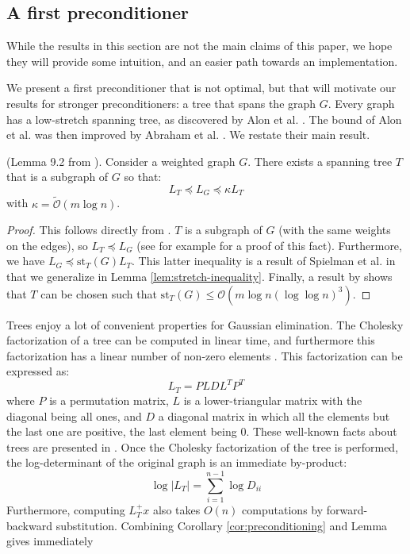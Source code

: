 
\subsection{A first preconditioner\label{sec:A-first-preconditioner}}

While the results in this section are not the main claims of this
paper, we hope they will provide some intuition, and an easier path
towards an implementation.

We present a first preconditioner that is not optimal, but that will
motivate our results for stronger preconditioners: a tree that spans
the graph $G$. Every graph has a low-stretch spanning tree, as discovered
by Alon et al. \cite{Alon1995}. The bound of Alon et al. was then
improved by Abraham et al. \cite{Abraham2008}. We restate their main
result. 
\begin{lemma}(Lemma 9.2 from \cite{Spielman2009a}). Consider a weighted graph $G$. There exists a spanning tree $T$ that is a subgraph of $G$ so that: 
\[
L_{T}\preceq L_{G}\preceq\kappa L_{T}
\]
with $\kappa = \tilde{\mathcal{O}}\left(m\log n\right)$. %
\label{lem:tree-st}
\end{lemma} 

\begin{proof} This follows directly from \cite{Spielman2009a}. $T$
is a subgraph of $G$ (with the same weights on the edges), so
$L_{T}\preceq L_{G}$ (see \cite{Spielman2009a} for example for a
proof of this fact). Furthermore, we have $L_{G}\preceq\text{st}_{T}\left(G\right)L_{T}$.
This latter inequality is a result of Spielman et al. in \cite{Spielman2010} that we generalize
in Lemma \ref{lem:stretch-inequality}. Finally, a result by \cite{Abraham2008} shows that $T$ can be chosen such that $\text{st}_{T}\left(G\right) \leq \mathcal{O}(m\log n (\log\log n)^3)$.\end{proof}

Trees enjoy a lot of convenient properties for Gaussian elimination.
The Cholesky factorization of a tree can be computed in linear time,
and furthermore this factorization has a linear number of non-zero
elements \cite{Spielman2009a}. This factorization can be expressed
as: 
\[
L_{T}=PLDL^{T}P^{T}
\]
where $P$ is a permutation matrix, $L$ is a lower-triangular matrix
with the diagonal being all ones, and $D$ a diagonal matrix in which
all the elements but the last one are positive, the last element being
$0$. These well-known facts about trees are presented in \cite{Spielman2009a}.
Once the Cholesky factorization of the tree is performed, the log-determinant
of the original graph is an immediate by-product: 
\[
\log\left|L_{T}\right|=\sum_{i=1}^{n-1}\log D_{ii}
\]
Furthermore, computing $L_{T}^{+}x$ also takes $O\left(n\right)$
computations by forward-backward substitution. Combining Corollary
\ref{cor:preconditioning} and Lemma \cite{lem:tree-st} gives immediately

